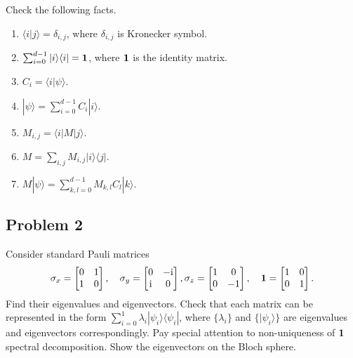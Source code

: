 \documentclass[a4paper,10pt]{article}
\newcommand{\ket}[1]{|#1\rangle}
\newcommand{\bra}[1]{\langle#1|}
\begin{document}
Check the following facts.
\begin{enumerate}
	\item $\bra{i}j\rangle = \delta_{i,j}$, where $\delta_{i,j}$ is Kronecker symbol.
	\item $\sum_{i=0}^{d-1}\ket{i}\bra{i}={\bf 1}$, where ${\bf 1}$ is the identity matrix.
	\item $C_i = \bra{i} \psi \rangle$.
	\item $\ket{\psi}=\sum_{i=0}^{d-1} C_i \ket{i}$.
	\item $M_{i,j} = \bra{i}M\ket{j}$.
	\item $M=\sum_{i,j}M_{i,j}\ket{i}\bra{j}$.
	\item $M\ket{\psi}=\sum_{k,l=0}^{d-1}M_{k,l}C_l\ket{k}$.
\end{enumerate}

\subsection*{Problem 2}
Consider standard Pauli matrices
\begin{equation}
	\sigma_x = \begin{bmatrix}
	0 & 1 \\ 1 & 0 \\
	\end{bmatrix}, \quad
		\sigma_y = \begin{bmatrix}
	0 & -{\rm i} \\ {\rm i} & 0 \\
	\end{bmatrix}, 
	\sigma_z = \begin{bmatrix}
		1 & 0 \\ 0 & -1 \\
	\end{bmatrix}, \quad
	{\bf 1} = \begin{bmatrix}
		1 & 0 \\ 0 & 1
	\end{bmatrix}.
\end{equation}
Find their eigenvalues and eigenvectors. 
Check that each matrix can be represented in the form $\sum_{i=0}^{1}\lambda_i\ket{\psi_i}\bra{\psi_i}$, where $\{\lambda_i\}$ and $\{\ket{\psi_i}\}$ are eigenvalues and eigenvectors correspondingly.
Pay special attention to non-uniqueness of ${\bf 1}$ spectral decomposition.
Show the eigenvectors on the Bloch sphere.
\end{document}
